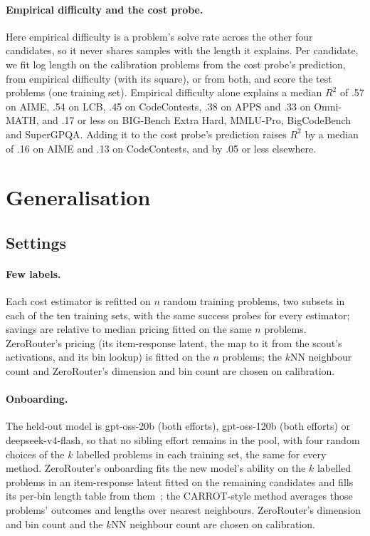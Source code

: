 \documentclass[10pt]{article}
\begin{document}
\paragraph{Empirical difficulty and the cost probe.} Here empirical difficulty is a problem's solve rate across the other four candidates, so it never shares samples with the length it explains. Per candidate, we fit log length on the calibration problems from the cost probe's prediction, from empirical difficulty (with its square), or from both, and score the test problems (one training set). Empirical difficulty alone explains a median $R^2$ of .57 on AIME, .54 on LCB, .45 on CodeContests, .38 on APPS and .33 on Omni-MATH, and .17 or less on BIG-Bench Extra Hard, MMLU-Pro, BigCodeBench and SuperGPQA. Adding it to the cost probe's prediction raises $R^2$ by a median of .16 on AIME and .13 on CodeContests, and by .05 or less elsewhere.



\FloatBarrier
\section{Generalisation}\label{app:transfer}
\subsection{Settings}\label{app:settings}
\paragraph{Few labels.} Each cost estimator is refitted on $n$ random training problems, two subsets in each of the ten training sets, with the same success probes for every estimator; savings are relative to median pricing fitted on the same $n$ problems. ZeroRouter's pricing (its item-response latent, the map to it from the scout's activations, and its bin lookup) is fitted on the $n$ problems; the $k$NN neighbour count and ZeroRouter's dimension and bin count are chosen on calibration.
\paragraph{Onboarding.} The held-out model is gpt-oss-20b (both efforts), gpt-oss-120b (both efforts) or deepseek-v4-flash, so that no sibling effort remains in the pool, with four random choices of the $k$ labelled problems in each training set, the same for every method. ZeroRouter's onboarding fits the new model's ability on the $k$ labelled problems in an item-response latent fitted on the remaining candidates and fills its per-bin length table from them~\citep{zerorouter}; the CARROT-style method averages those problems' outcomes and lengths over nearest neighbours. ZeroRouter's dimension and bin count and the $k$NN neighbour count are chosen on calibration.
\end{document}
